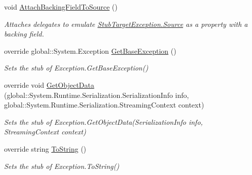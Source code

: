 \begin{DoxyCompactItemize}
void \hyperlink{class_system_1_1_reflection_1_1_fakes_1_1_stub_target_exception_a8006f534f6c3d541d758b146bac50e03}{Attach\-Backing\-Field\-To\-Source} ()
\begin{DoxyCompactList}\small\item\em Attaches delegates to emulate \hyperlink{class_system_1_1_reflection_1_1_fakes_1_1_stub_target_exception_ac32401e5464f3653d24c16dd7b7cbb32}{Stub\-Target\-Exception.\-Source} as a property with a backing field.\end{DoxyCompactList}\item 
override global\-::\-System.\-Exception \hyperlink{class_system_1_1_reflection_1_1_fakes_1_1_stub_target_exception_a10c0eb9bb061759bd1740992cead5ead}{Get\-Base\-Exception} ()
\begin{DoxyCompactList}\small\item\em Sets the stub of Exception.\-Get\-Base\-Exception()\end{DoxyCompactList}\item 
override void \hyperlink{class_system_1_1_reflection_1_1_fakes_1_1_stub_target_exception_a8996d1c27158c1030b6f9fb9d09de3dd}{Get\-Object\-Data} (global\-::\-System.\-Runtime.\-Serialization.\-Serialization\-Info info, global\-::\-System.\-Runtime.\-Serialization.\-Streaming\-Context context)
\begin{DoxyCompactList}\small\item\em Sets the stub of Exception.\-Get\-Object\-Data(\-Serialization\-Info info, Streaming\-Context context)\end{DoxyCompactList}\item 
override string \hyperlink{class_system_1_1_reflection_1_1_fakes_1_1_stub_target_exception_ad7728a9e521e9dfbb643f55cdab06d64}{To\-String} ()
\begin{DoxyCompactList}\small\item\em Sets the stub of Exception.\-To\-String()\end{DoxyCompactList}\end{DoxyCompactItemize}
